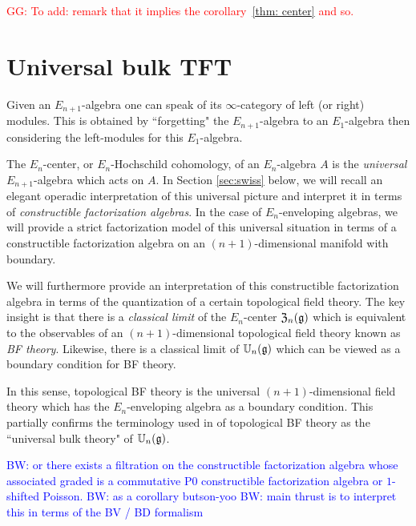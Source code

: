 \documentclass[11pt]{amsart}
\numberwithin{equation}{section}
\def\brian{\textcolor{blue}{BW: }\textcolor{blue}}
\def\greg{\textcolor{red}{GG: }\textcolor{red}}
\begin{document}
\greg{To add: remark that it implies the corollary~\ref{thm: center} and so.}

\section{Universal bulk TFT}
\label{sec: TFT}

Given an $E_{n+1}$-algebra one can speak of its $\infty$-category of left (or right) modules.
This is obtained by ``forgetting" the $E_{n+1}$-algebra to an $E_1$-algebra then considering the left-modules for this $E_1$-algebra.

The $E_n$-center, or $E_n$-Hochschild cohomology, of an $E_n$-algebra $A$ is the {\em universal} $E_{n+1}$-algebra which acts on $A$. 
In Section \ref{sec:swiss} below, we will recall an elegant operadic interpretation of this universal picture and interpret it in terms of {\em constructible factorization algebras}. 
In the case of $E_n$-enveloping algebras, we will provide a strict factorization model of this universal situation in terms of a constructible factorization algebra on an $(n+1)$-dimensional 
manifold with boundary. 

We will furthermore provide an interpretation of this constructible factorization algebra in terms of the quantization of a certain topological field theory. 
The key insight is that there is a {\em classical limit} of the $E_n$-center $\mathfrak Z_n(\mathfrak g)$ which is equivalent to the observables of an $(n+1)$-dimensional topological field theory known as {\em BF theory}. 
Likewise, there is a classical limit of $\mathbb U_n(\mathfrak g)$ which can be viewed as a boundary condition for BF theory.

In this sense, topological BF theory is the universal $(n+1)$-dimensional field theory which has the $E_n$-enveloping algebra as a boundary condition. 
This partially confirms the terminology used in \cite{ButsonYoo}  of topological BF theory as the ``universal bulk theory" of $\mathbb U_n(\mathfrak g)$. 


\brian{or there exists a filtration on the constructible factorization algebra whose associated graded is a commutative P0 constructible factorization algebra or $1$-shifted Poisson.}
\brian{as a corollary butson-yoo}
\brian{main thrust is to interpret this in terms of the BV / BD formalism}
\end{document}
